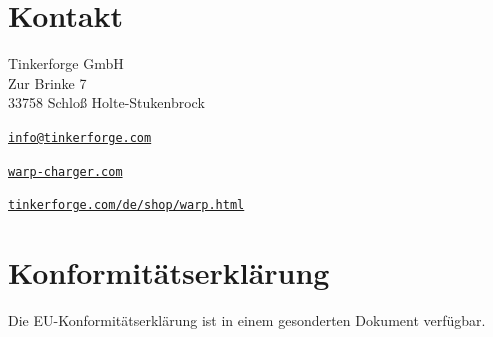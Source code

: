 \documentclass[a4paper,10pt]{article}
\begin{document}
\begin{multicols*}{2}
	\section{Kontakt}
	Tinkerforge GmbH\\ Zur Brinke 7\\ 33758 Schloß Holte-Stukenbrock\\
	\begin{description}[leftmargin=!,labelwidth=\widthof{\textbf{Website}}]
		\item[E-Mail] \href{mailto:info@tinkerforge.com}{\texttt{info@tinkerforge.com}}
		\item[Website] \href{https://warp-charger.com}{\texttt{warp-charger.com}}
		\item[Shop] \href{https://tinkerforge.com/de/shop/warp.html}{\texttt{tinkerforge.com/de/shop/warp.html}}
	\end{description}

	\section{Konformitätserklärung}
	Die EU-Konformitätserklärung ist in einem gesonderten Dokument verfügbar.


\end{multicols*}
\end{document}
